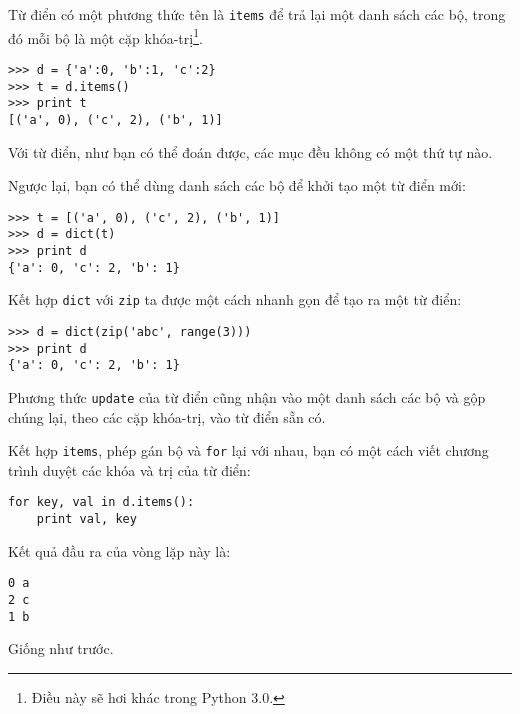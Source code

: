 \documentclass[11pt]{book}
\begin{document}

Từ điển có một phương thức tên là {\tt items} để trả lại một danh sách
các bộ, trong đó mỗi bộ là một cặp khóa-trị\footnote{Điều này sẽ 
  hơi khác trong Python 3.0.}.

\beforeverb
\begin{verbatim}
>>> d = {'a':0, 'b':1, 'c':2}
>>> t = d.items()
>>> print t
[('a', 0), ('c', 2), ('b', 1)]
\end{verbatim}
\afterverb
%
Với từ điển, như bạn có thể đoán được, các mục đều không có
một thứ tự nào.


Ngược lại, bạn có thể dùng danh sách các bộ để khởi tạo một
từ điển mới:

\beforeverb
\begin{verbatim}
>>> t = [('a', 0), ('c', 2), ('b', 1)]
>>> d = dict(t)
>>> print d
{'a': 0, 'c': 2, 'b': 1}
\end{verbatim}
\afterverb

Kết hợp {\tt dict} với {\tt zip} ta được một cách nhanh gọn để tạo ra
một từ điển:


\beforeverb
\begin{verbatim}
>>> d = dict(zip('abc', range(3)))
>>> print d
{'a': 0, 'c': 2, 'b': 1}
\end{verbatim}
\afterverb
%
Phương thức {\tt update} của từ điển cũng nhận vào một danh sách
các bộ và gộp chúng lại, theo các cặp khóa-trị, vào từ điển sẵn có.



Kết hợp {\tt items}, phép gán bộ và {\tt for} lại với nhau, bạn
có một cách viết chương trình duyệt các khóa và trị của từ điển:

\beforeverb
\begin{verbatim}
for key, val in d.items():
    print val, key
\end{verbatim}
\afterverb
%
Kết quả đầu ra của vòng lặp này là:

\beforeverb
\begin{verbatim}
0 a
2 c
1 b
\end{verbatim}
\afterverb
%
Giống như trước.

\end{document}
